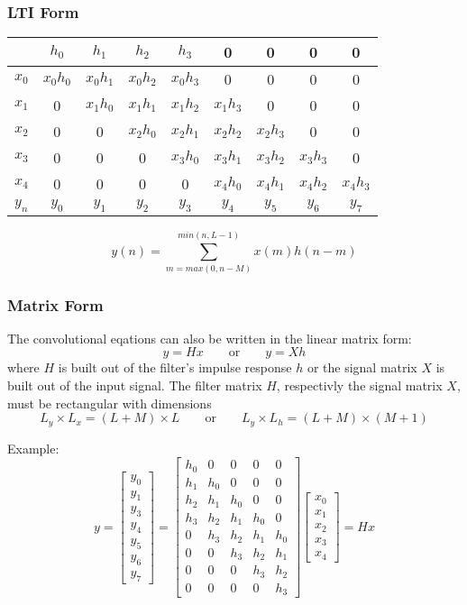 \subsubsection{LTI Form}
\begin{tabular}{c|cccccccc|}
	& $h_0$ & $h_1$ & $h_2$ & $h_3$ & 0 & 0 & 0 & 0 \\
	\hline
	$x_0$ & $x_0h_0$ & $x_0h_1$ & $x_0h_2$ & $x_0h_3$ & 0 & 0 & 0 & 0 \\
	$x_1$ & 0 & $x_1h_0$ & $x_1h_1$ & $x_1h_2$ & $x_1h_3$ & 0 & 0 & 0 \\
	$x_2$ & 0 & 0 & $x_2h_0$ & $x_2h_1$ & $x_2h_2$ & $x_2h_3$ & 0 & 0 \\
	$x_3$ & 0 & 0 & 0 & $x_3h_0$ & $x_3h_1$ & $x_3h_2$ & $x_3h_3$ & 0 \\
	$x_4$ & 0 & 0 & 0 & 0 & $x_4h_0$ & $x_4h_1$ & $x_4h_2$ & $x_4h_3$ \\
	\hline
	$y_n$ & $y_0$ & $y_1$ & $y_2$ & $y_3$ & $y_4$ & $y_5$ & $y_6$ & $y_7$ \\
\end{tabular}
\[
	y(n) = \sum\limits_{m=max(0,n-M)}^{min(n,L-1)} x(m)h(n-m)
\]


\subsubsection{Matrix Form}
The convolutional eqations can also be written in the linear matrix form:
\[
	y = H  x	\qquad \text{or} \qquad y = Xh
\]
where $H$ is built out of the filter's impulse response $h$ or the signal matrix $X$ is built out of the input signal. 
The filter matrix $H$, respectivly the signal matrix $X$, must be rectangular with dimensions
\[
	L_y \times L_x = (L + M)\times L \qquad \text{or} \qquad
	L_y \times L_h = (L + M)\times (M + 1)
\]

Example:
\[
	y =
	\begin{bmatrix}
		y_0 \\
		y_1 \\
		y_3 \\
		y_4 \\
		y_5 \\
		y_6 \\
		y_7
	\end{bmatrix}
	= \begin{bmatrix}
		h_0	& 0		& 0		& 0		& 0 \\
		h_1	& h_0	& 0 	& 0 	& 0 \\
		h_2	& h_1	& h_0	& 0		& 0 \\
		h_3 & h_2	& h_1	& h_0	& 0 \\
		0	& h_3	& h_2	& h_1	& h_0 \\
		0	& 0		& h_3	& h_2	& h_1 \\
		0	& 0		& 0		& h_3	& h_2 \\
		0	& 0		& 0		& 0		& h_3	 
	  \end{bmatrix}
	  \begin{bmatrix}
	  	x_0 \\
	  	x_1 \\
	  	x_2 \\
	  	x_3 \\
	  	x_4
	  \end{bmatrix}
	= Hx
\]
\resetArrayStretch


